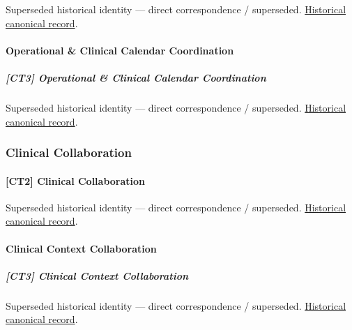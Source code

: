 \par\label{element:8b42aac6083441caa78b59f5e62eebd9}
Superseded historical identity — direct correspondence / superseded. \href{../../../../continuum/strategy/capability/8b42aac6083441caa78b59f5e62eebd9.md}{Historical canonical record}.\par

\paragraph{Operational \& Clinical Calendar Coordination}

\subparagraph{[CT3] Operational \& Clinical Calendar Coordination}

\par\label{element:c0f6e5f7f5a94d1580fa6e0e8b82c93a}
Superseded historical identity — direct correspondence / superseded. \href{../../../../continuum/strategy/capability/c0f6e5f7f5a94d1580fa6e0e8b82c93a.md}{Historical canonical record}.\par

\subsubsection{Clinical Collaboration}

\paragraph{[CT2] Clinical Collaboration}

\par\label{element:c5adc1955b6046d8b920b0176cebc9de}
Superseded historical identity — direct correspondence / superseded. \href{../../../../continuum/strategy/capability/c5adc1955b6046d8b920b0176cebc9de.md}{Historical canonical record}.\par

\paragraph{Clinical Context Collaboration}

\subparagraph{[CT3] Clinical Context Collaboration}

\par\label{element:750ef0d8e1504a8e9a1fde9bf13a6d0c}
Superseded historical identity — direct correspondence / superseded. \href{../../../../continuum/strategy/capability/750ef0d8e1504a8e9a1fde9bf13a6d0c.md}{Historical canonical record}.\par

